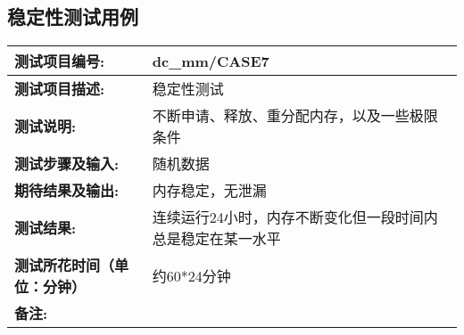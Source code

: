 \subsection{稳定性测试用例}
\begin{table}[H]
\centering
\begin{tabular}{|p{8em}|p{22em}|}
\hline
\textbf{测试项目编号:}&dc\_mm/CASE7\\
\hline
\textbf{测试项目描述:}&稳定性测试\\
\hline
\textbf{测试说明:}&不断申请、释放、重分配内存，以及一些极限条件\\
\hline
\textbf{测试步骤及输入:}&随机数据\\
\hline
\textbf{期待结果及输出:}&内存稳定，无泄漏\\
\hline
\textbf{测试结果:}&连续运行24小时，内存不断变化但一段时间内总是稳定在某一水平\\
\hline
\textbf{测试所花时间（单位：分钟）}& 约60*24分钟\\
\hline
\textbf{备注:}& \\
\hline
\end{tabular}
\end{table}



%
